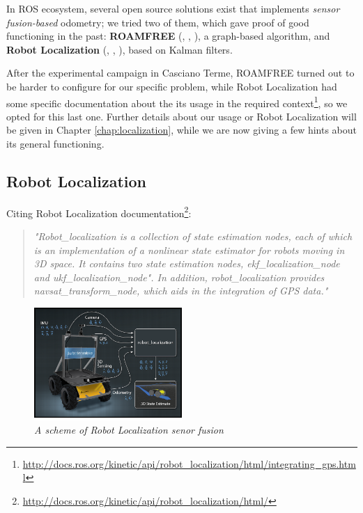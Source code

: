In \ac{ROS} ecosystem, several open source solutions exist that implements \textit{sensor fusion-based} odometry; we tried two of them, which gave proof of good functioning in the past: \textbf{ROAMFREE} (\cite{roamfreePaper}, \cite{roamfreeUtilizzo1}, \cite{roamfreeUtilizzo2}), a graph-based algorithm, and \textbf{Robot Localization} (\cite{robotLocalizationPaper}, \cite{robotLocalizationUtilizzo1}, \cite{robotLocalizationUtlizzo2}), based on Kalman filters.

After the experimental campaign in Casciano Terme, ROAMFREE turned out to be harder to configure for our specific problem, while Robot Localization had some specific documentation about the its usage in the required context\footnote{\url{http://docs.ros.org/kinetic/api/robot\_localization/html/integrating\_gps.html}},
so we opted for this last one. Further details about our usage or Robot Localization will be given in Chapter \ref{chap:localization}, while we are now giving a few hints about its general functioning.

\subsection{Robot Localization}

Citing Robot Localization documentation\footnote{\url{http://docs.ros.org/kinetic/api/robot\_localization/html/}}:
\blockquote{\textit{"Robot\_localization is a collection of state estimation nodes, each of which is an implementation of a nonlinear state estimator for robots moving in 3D space. It contains two state estimation nodes, ekf\_localization\_node and ukf\_localization\_node". In addition, robot\_localization provides navsat\_transform\_node, which aids in the integration of GPS data."}}

\begin{figure}
	\centering
	\includegraphics[width=0.5\textwidth]{Images/background_and_tools/robotLocalizationLogo.png}
	\caption{\textit{A scheme of Robot Localization senor fusion}}
	\label{fig:robotLocalizationDisegno}
\end{figure}

